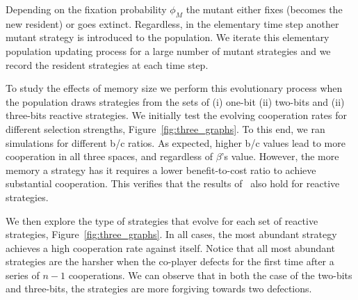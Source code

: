 \documentclass{article}
\theoremstyle{definition}
\begin{document}
Depending on the fixation probability \(\phi_{M}\) the mutant either fixes
(becomes the new resident) or goes extinct. Regardless, in the elementary time
step another mutant strategy is introduced to the  population. We iterate this
elementary population updating process for a large number of mutant strategies
and we record the resident strategies at each time step.

To study the effects of memory size we perform this evolutionary process when
the population draws strategies from the sets of (i) one-bit (ii) two-bits and
(ii) three-bits reactive strategies. We initially test the evolving cooperation
rates for different selection strengths, Figure~\ref{fig:three_graphs}. To this end, we ran simulations for
different b/c ratios. As expected, higher b/c values lead to more cooperation in
all three spaces, and regardless of \(\beta\)'s value. However, the more memory
a strategy has it requires a lower benefit-to-cost ratio to achieve substantial
cooperation. This verifies that the results of~\citep{hilbe:PNAS:2017} also
hold for reactive strategies.

We then explore the type of strategies that evolve for each set of reactive
strategies, Figure~\ref{fig:three_graphs}. In all cases, the most abundant
strategy achieves a high cooperation rate against itself. Notice that all most
abundant strategies are the harsher when the co-player defects for the first
time after a series of \(n \!- \!1\) cooperations. We can observe that in both the
case of the two-bits and three-bits, the strategies are more forgiving towards
two defections.
\end{document}
